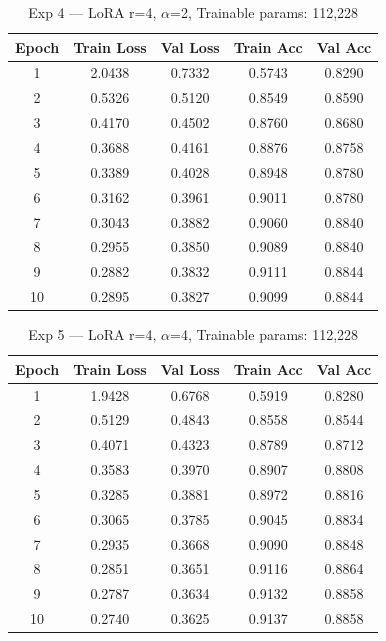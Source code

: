 \documentclass[12pt,a4paper]{article}
\begin{document}
\begin{table}[H]
\centering
\caption{Exp 4 — LoRA r=4, $\alpha$=2, Trainable params: 112,228}
\small
\begin{tabular}{ccccc}
\toprule
Epoch & Train Loss & Val Loss & Train Acc & Val Acc \\ \midrule
1  & 2.0438 & 0.7332 & 0.5743 & 0.8290 \\
2  & 0.5326 & 0.5120 & 0.8549 & 0.8590 \\
3  & 0.4170 & 0.4502 & 0.8760 & 0.8680 \\
4  & 0.3688 & 0.4161 & 0.8876 & 0.8758 \\
5  & 0.3389 & 0.4028 & 0.8948 & 0.8780 \\
6  & 0.3162 & 0.3961 & 0.9011 & 0.8780 \\
7  & 0.3043 & 0.3882 & 0.9060 & 0.8840 \\
8  & 0.2955 & 0.3850 & 0.9089 & 0.8840 \\
9  & 0.2882 & 0.3832 & 0.9111 & 0.8844 \\
10 & 0.2895 & 0.3827 & 0.9099 & 0.8844 \\
\bottomrule
\end{tabular}
\end{table}

\begin{table}[H]
\centering
\caption{Exp 5 — LoRA r=4, $\alpha$=4, Trainable params: 112,228}
\small
\begin{tabular}{ccccc}
\toprule
Epoch & Train Loss & Val Loss & Train Acc & Val Acc \\ \midrule
1  & 1.9428 & 0.6768 & 0.5919 & 0.8280 \\
2  & 0.5129 & 0.4843 & 0.8558 & 0.8544 \\
3  & 0.4071 & 0.4323 & 0.8789 & 0.8712 \\
4  & 0.3583 & 0.3970 & 0.8907 & 0.8808 \\
5  & 0.3285 & 0.3881 & 0.8972 & 0.8816 \\
6  & 0.3065 & 0.3785 & 0.9045 & 0.8834 \\
7  & 0.2935 & 0.3668 & 0.9090 & 0.8848 \\
8  & 0.2851 & 0.3651 & 0.9116 & 0.8864 \\
9  & 0.2787 & 0.3634 & 0.9132 & 0.8858 \\
10 & 0.2740 & 0.3625 & 0.9137 & 0.8858 \\
\bottomrule
\end{tabular}
\end{table}
\end{document}
